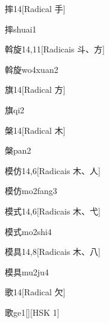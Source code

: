 \begin{entry}{摔}{14}[Radical ⼿]
  \begin{phonetics}{摔}{shuai1}
  \end{phonetics}
\end{entry}

\begin{entry}{斡旋}{14,11}[Radicais ⽃、⽅]
  \begin{phonetics}{斡旋}{wo4xuan2}
  \end{phonetics}
\end{entry}

\begin{entry}{旗}{14}[Radical ⽅]
  \begin{phonetics}{旗}{qi2}
  \end{phonetics}
\end{entry}

\begin{entry}{槃}{14}[Radical ⽊]
  \begin{phonetics}{槃}{pan2}
  \end{phonetics}
\end{entry}

\begin{entry}{模仿}{14,6}[Radicais ⽊、⼈]
  \begin{phonetics}{模仿}{mo2fang3}
  \end{phonetics}
\end{entry}

\begin{entry}{模式}{14,6}[Radicais ⽊、⼷]
  \begin{phonetics}{模式}{mo2shi4}
  \end{phonetics}
\end{entry}

\begin{entry}{模具}{14,8}[Radicais ⽊、⼋]
  \begin{phonetics}{模具}{mu2ju4}
  \end{phonetics}
\end{entry}

\begin{entry}{歌}{14}[Radical ⽋]
  \begin{phonetics}{歌}{ge1}[][HSK 1]
  \end{phonetics}
\end{entry}

